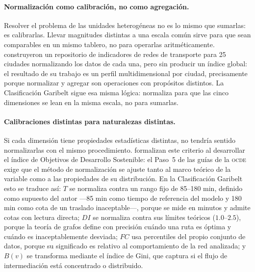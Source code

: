 \paragraph{Normalización como calibración, no como agregación.}
\label{subsubsec:garibelt-normalizacion}

Resolver el problema de las unidades heterogéneas no es lo mismo que sumarlas:
es calibrarlas. Llevar magnitudes distintas a una escala común sirve para que
sean comparables en un mismo tablero, no para operarlas aritméticamente.
\citet{kujala2018} construyeron un repositorio de indicadores de redes de
transporte para 25 ciudades normalizando los datos \gtfs{} de cada una, pero sin
producir un índice global: el resultado de su trabajo es un perfil
multidimensional por ciudad, precisamente porque normalizar y agregar son
operaciones con propósitos distintos. La Clasificación Garibelt sigue esa misma
lógica: normaliza para que las cinco dimensiones se lean en la misma escala, no
para sumarlas.

\paragraph{Calibraciones distintas para naturalezas distintas.}
\label{subsubsec:garibelt-calibraciones}

Si cada dimensión tiene propiedades estadísticas distintas, no tendría sentido
normalizarlas con el mismo procedimiento. \citet{talukder2017} formalizan este
criterio al desarrollar el índice de Objetivos de Desarrollo Sostenible: el
Paso~5 de las guías de la \textsc{ocde} exige que el método de normalización se
ajuste tanto al marco teórico de la variable como a las propiedades de su
distribución. En la Clasificación Garibelt esto se traduce así: $T$ se normaliza
contra un rango fijo de 85–180 min, definido como supuesto del autor ---85 min
como tiempo de referencia del modelo y 180 min como cota de un traslado
inaceptable---, porque se mide en minutos y admite cotas con lectura directa;
$DI$ se normaliza contra sus límites teóricos ($1.0$–$2.5$), porque la teoría de
grafos define con precisión cuándo una ruta es óptima y cuándo es
inaceptablemente desviada; $FC$ usa percentiles del propio conjunto de datos, porque su
significado es relativo al comportamiento de la red analizada; y $B(v)$ se
transforma mediante el índice de Gini, que captura si el flujo de intermediación
está concentrado o distribuido.

